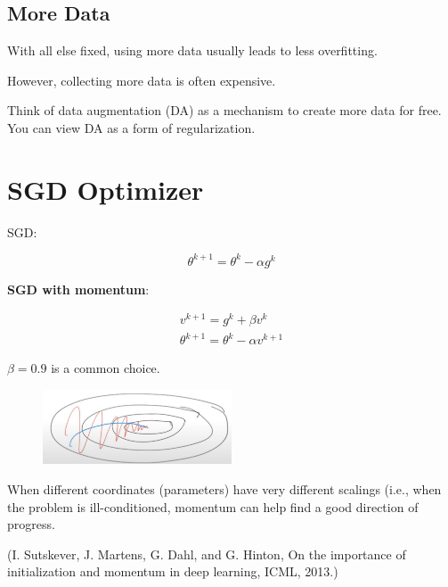 \subsection{More Data}

\begin{concept}
    With all else fixed, using more data usually leads to less overfitting.

    However, collecting more data is often expensive.

    Think of data augmentation (DA) as a mechanism to create more data for free. You can view DA as a form of regularization.
\end{concept}

\section{SGD Optimizer}

\begin{definition}
    SGD:

    $$
    \theta^{k+1}=\theta^{k}-\alpha g^{k}
    $$

    \textbf{SGD with momentum}:

    $$
    \begin{gathered}
    v^{k+1}=g^{k}+\beta v^{k} \\
    \theta^{k+1}=\theta^{k}-\alpha v^{k+1}
    \end{gathered}
    $$

    $\beta=0.9$ is a common choice.

    \begin{figure}[H]
        \centering
        \includegraphics[width=0.5\textwidth]{.././assets/6.9.png}
    \end{figure}

    When different coordinates (parameters) have very different scalings (i.e., when the problem is ill-conditioned, momentum can help find a good direction of progress.

    (I. Sutskever, J. Martens, G. Dahl, and G. Hinton, On the importance of initialization and momentum in deep learning, ICML, 2013.)
\end{definition}

